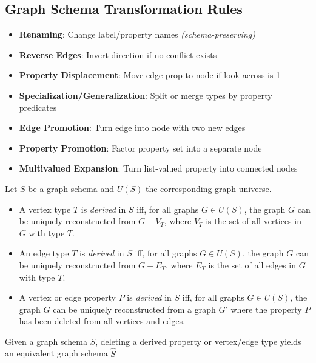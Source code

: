 \documentclass{article}
\begin{document}
\subsection*{Graph Schema Transformation Rules}
\begin{itemize}
  \item \textbf{Renaming}: Change label/property names \textit{(schema-preserving)}
  \item \textbf{Reverse Edges}: Invert direction if no conflict exists
  \item \textbf{Property Displacement}: Move edge prop to node if look-across is 1
  \item \textbf{Specialization/Generalization}: Split or merge types by property predicates
  \item \textbf{Edge Promotion}: Turn edge into node with two new edges
  \item \textbf{Property Promotion}: Factor property set into a separate node
  \item \textbf{Multivalued Expansion}: Turn list-valued property into connected nodes
\end{itemize}


Let $S$ be a graph schema and $U(S)$ the corresponding graph universe.

\begin{itemize}
    \item A vertex type $T$ is \emph{derived} in $S$ iff, for all graphs $G \in U(S)$, the graph $G$ can be uniquely reconstructed from $G - V_T$, where $V_T$ is the set of all vertices in $G$ with type $T$.
    
    \item An edge type $T$ is \emph{derived} in $S$ iff, for all graphs $G \in U(S)$, the graph $G$ can be uniquely reconstructed from $G - E_T$, where $E_T$ is the set of all edges in $G$ with type $T$.
    
    \item A vertex or edge property $P$ is \emph{derived} in $S$ iff, for all graphs $G \in U(S)$, the graph $G$ can be uniquely reconstructed from a graph $G'$ where the property $P$ has been deleted from all vertices and edges.
\end{itemize}

Given a graph schema $S$, deleting a derived property or vertex/edge type yields an equivalent graph schema $\hat{S}$
\end{document}

